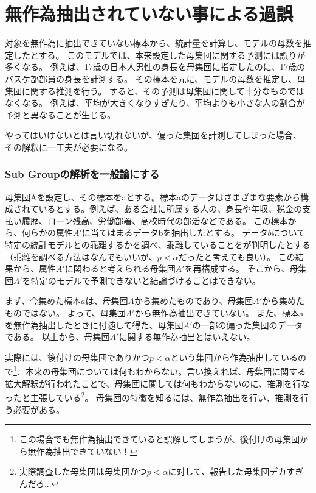 \section{無作為抽出されていない事による過誤}
対象を無作為に抽出できていない標本から、統計量を計算し、モデルの母数を推定したとする。
このモデルでは、本来設定した母集団に関する予測には誤りが多くなる。
例えば、17歳の日本人男性の身長を母集団に指定したのに、17歳のバスケ部部員の身長を計測する。
その標本を元に、モデルの母数を推定し、母集団に関する推測を行う。
すると、その予測は母集団に関して十分なものではなくなる。
例えば、平均が大きくなりすぎたり、平均よりも小さな人の割合が予測と異なることが生じる。

やってはいけないとは言い切れないが、偏った集団を計測してしまった場合、
その解釈に一工夫が必要になる。



\subsubsection{Sub Groupの解析を一般論にする}
母集団Aを設定し、その標本をaとする。標本aのデータはさまざまな要素から構成されているとする。例えば、ある会社に所属する人の、身長や年収、税金の支払い履歴、ローン残高、労働部署、高校時代の部活などである。
この標本から、何らかの属性$A'$に当てはまるデータbを抽出したとする。
データ$b$について特定の統計モデルとの乖離するかを調べ、乖離していることをが判明したとする（乖離を調べる方法はなんでもいいが、$p<\alpha$だったと考えても良い）。
この結果から、属性$A'$に関わると考えられる母集団$A'$を再構成する。
そこから、母集団$A'$を特定のモデルで予測できないと結論づけることはできない。

まず、今集めた標本$a$は、母集団$A$から集めたものであり、母集団$A'$から集めたものではない。
よって、母集団$A'$から無作為抽出できていない。
また、標本aを無作為抽出したときに付随して得た、母集団$A'$の一部の偏った集団のデータである。
以上から、母集団$A'$に関する無作為抽出とはいえない。

実際には、後付けの母集団でありかつ$p<\alpha$という集団から作為抽出しているので\footnote{この場合でも無作為抽出できていると誤解してしまうが、後付けの母集団から無作為抽出できていない！}、本来の母集団については何もわからない。言い換えれば、母集団に関する拡大解釈が行われたことで、母集団に関しては何もわからないのに、推測を行なったと主張している\footnote{実際調査した母集団は母集団かつ$p<\alpha$に対して、報告した母集団デカすぎんだろ...}。
母集団の特徴を知るには、無作為抽出を行い、推測を行う必要がある。

